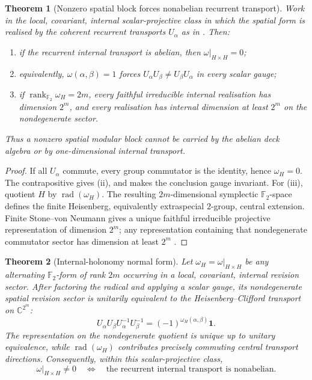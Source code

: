 \documentclass[11pt]{article}
\newtheorem{theorem}{Theorem}[section]
\theoremstyle{definition}
\theoremstyle{remark}
\newcommand{\C}{\mathbb{C}}
\newcommand{\F}{\mathbb{F}}
\newcommand{\rad}{\operatorname{rad}}
\newcommand{\rank}{\operatorname{rank}}
\newcommand{\one}{\mathbf{1}}
\begin{document}
\begin{theorem}[Nonzero spatial block forces nonabelian recurrent transport]
\label{thm:nonabelian-holonomy-necessary}
Work in the local, covariant, internal scalar-projective class in which the
spatial form is realised by the coherent recurrent transports $U_\alpha$ as in
.  Then:
\begin{enumerate}[label=\textup{(\roman*)},leftmargin=2.4em]
\item if the recurrent internal transport is abelian, then
      $\omega|_{H\times H}=0$;
\item equivalently, $\omega(\alpha,\beta)=1$ forces
      $U_\alpha U_\beta\ne U_\beta U_\alpha$ in every scalar gauge;
\item if $\rank_{\F_2}\omega_H=2m$, every faithful irreducible internal
      realisation has dimension $2^m$, and every realisation has internal
      dimension at least $2^m$ on the nondegenerate sector.
\end{enumerate}
Thus a nonzero spatial modular block cannot be carried by the abelian deck
algebra or by one-dimensional internal transport.
\end{theorem}

\begin{proof}
If all $U_\alpha$ commute, every group commutator is the identity, hence
$\omega_H=0$.  The contrapositive gives (ii), and
 makes the conclusion gauge invariant.
For (iii), quotient $H$ by $\rad(\omega_H)$.  The resulting $2m$-dimensional
symplectic $\F_2$-space defines the finite Heisenberg, equivalently extraspecial
$2$-group, central extension.  Finite Stone--von Neumann gives a unique faithful
irreducible projective representation of dimension $2^m$; any representation
containing that nondegenerate commutator sector has dimension at least $2^m$
\cite{karpilovsky,mackey}.
\end{proof}

\begin{theorem}[Internal-holonomy normal form]
\label{thm:internal-holonomy-normal-form}
Let $\omega_H=\omega|_{H\times H}$ be any alternating $\F_2$-form of rank $2m$
occurring in a local, covariant, internal revision sector.  After factoring the
radical and applying a scalar gauge, its nondegenerate spatial revision sector is
unitarily equivalent to the Heisenberg--Clifford transport on $\C^{2^m}$:
\[
 U_\alpha U_\beta U_\alpha^{-1}U_\beta^{-1}
 =(-1)^{\omega_H(\alpha,\beta)}\one.
\]
The representation on the nondegenerate quotient is unique up to unitary
equivalence, while $\rad(\omega_H)$ contributes precisely commuting central
transport directions.  Consequently, within this scalar-projective class,
\[
 \omega|_{H\times H}\ne0
 \quad\Longleftrightarrow\quad
 \text{the recurrent internal transport is nonabelian}.
\]
\end{theorem}
\end{document}
